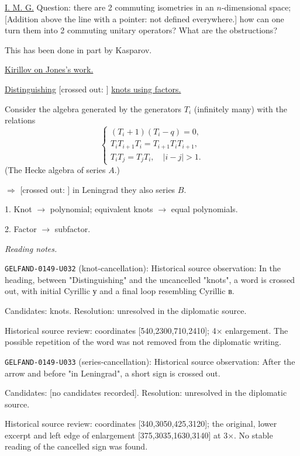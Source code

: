 \underline{I. M. G.} Question: there are 2 commuting isometries in an $n$-dimensional space;
[Addition above the line with a pointer: not defined everywhere.]
how can one turn them into 2 commuting unitary operators? What are the obstructions?

This has been done in part by Kasparov.

\underline{Kirillov on Jones's work.}

\underline{Distinguishing}
[crossed out: ]
\underline{knots using factors.}

Consider the algebra generated by the generators $T_i$ (infinitely many) with the relations
\begin{equation*}
\begin{cases}
(T_i+1)(T_i-q)=0,\\
T_iT_{i+1}T_i=T_{i+1}T_iT_{i+1},\\
T_iT_j=T_jT_i,\quad |i-j|>1.
\end{cases}
\tag{1}
\end{equation*}
(The Hecke algebra of series $A$.)

$\Rightarrow$ [crossed out:
]
in Leningrad they 
also series $B$.

1. Knot $\longrightarrow$ polynomial; equivalent knots $\longrightarrow$ equal polynomials.

2. Factor $\longrightarrow$ subfactor.


\par\smallskip\noindent\textit{Reading notes.}\par
\noindent\texttt{GELFAND-0149-U032} (knot-cancellation): Historical source observation: In the heading, between "Distinguishing" and the uncancelled "knots", a word is crossed out, with initial Cyrillic у and a final loop resembling Cyrillic в.\par
Candidates: knots. Resolution: unresolved in the diplomatic source.\par
Historical source review: coordinates [540,2300,710,2410]; 4× enlargement. The possible repetition of the word was not removed from the diplomatic writing.\par

\noindent\texttt{GELFAND-0149-U033} (series-cancellation): Historical source observation: After the arrow and before "in Leningrad", a short sign is crossed out.\par
Candidates: [no candidates recorded]. Resolution: unresolved in the diplomatic source.\par
Historical source review: coordinates [340,3050,425,3120]; the original, lower excerpt and left edge of enlargement [375,3035,1630,3140] at 3×. No stable reading of the cancelled sign was found.\par

